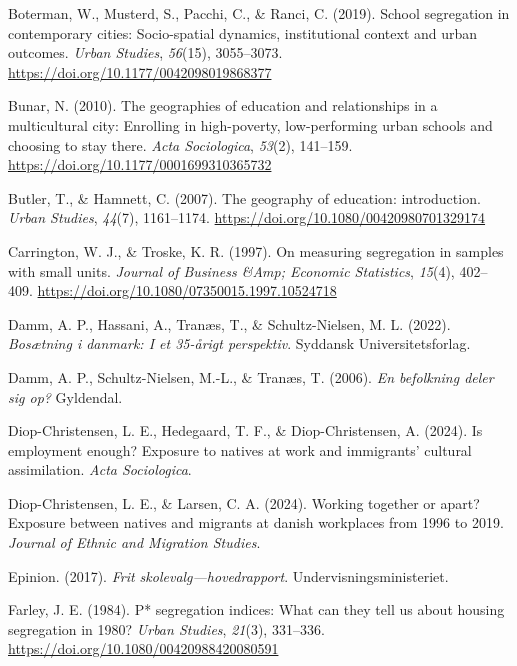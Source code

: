 \documentclass[
]{book}
\newlength{\cslhangindent}
\newenvironment{CSLReferences}[2] %
 {\begin{list}{}{%
  \setlength{\itemindent}{0pt}
  \setlength{\leftmargin}{0pt}
  \setlength{\parsep}{0pt}
  \ifodd #1
   \setlength{\leftmargin}{\cslhangindent}
   \setlength{\itemindent}{-1\cslhangindent}
  \fi
  \setlength{\itemsep}{#2\baselineskip}}}
 {\end{list}}
\begin{document}
\begin{CSLReferences}{1}{0}
Boterman, W., Musterd, S., Pacchi, C., \& Ranci, C. (2019). School segregation in contemporary cities: Socio-spatial dynamics, institutional context and urban outcomes. \emph{Urban Studies}, \emph{56}(15), 3055--3073. \url{https://doi.org/10.1177/0042098019868377}

Bunar, N. (2010). The geographies of education and relationships in a multicultural city: Enrolling in high-poverty, low-performing urban schools and choosing to stay there. \emph{Acta Sociologica}, \emph{53}(2), 141--159. \url{https://doi.org/10.1177/0001699310365732}

Butler, T., \& Hamnett, C. (2007). The geography of education: introduction. \emph{Urban Studies}, \emph{44}(7), 1161--1174. \url{https://doi.org/10.1080/00420980701329174}

Carrington, W. J., \& Troske, K. R. (1997). On measuring segregation in samples with small units. \emph{Journal of Business \&Amp; Economic Statistics}, \emph{15}(4), 402--409. \url{https://doi.org/10.1080/07350015.1997.10524718}

Damm, A. P., Hassani, A., Tranæs, T., \& Schultz-Nielsen, M. L. (2022). \emph{Bosætning i danmark: I et 35-årigt perspektiv}. Syddansk Universitetsforlag.

Damm, A. P., Schultz-Nielsen, M.-L., \& Tranæs, T. (2006). \emph{En befolkning deler sig op?} Gyldendal.

Diop-Christensen, L. E., Hedegaard, T. F., \& Diop-Christensen, A. (2024). Is employment enough? Exposure to natives at work and immigrants' cultural assimilation. \emph{Acta Sociologica}.

Diop-Christensen, L. E., \& Larsen, C. A. (2024). Working together or apart? Exposure between natives and migrants at danish workplaces from 1996 to 2019. \emph{Journal of Ethnic and Migration Studies}.

Epinion. (2017). \emph{Frit skolevalg---hovedrapport}. Undervisningsministeriet.

Farley, J. E. (1984). P* segregation indices: What can they tell us about housing segregation in 1980? \emph{Urban Studies}, \emph{21}(3), 331--336. \url{https://doi.org/10.1080/00420988420080591}


\end{CSLReferences}
\end{document}
